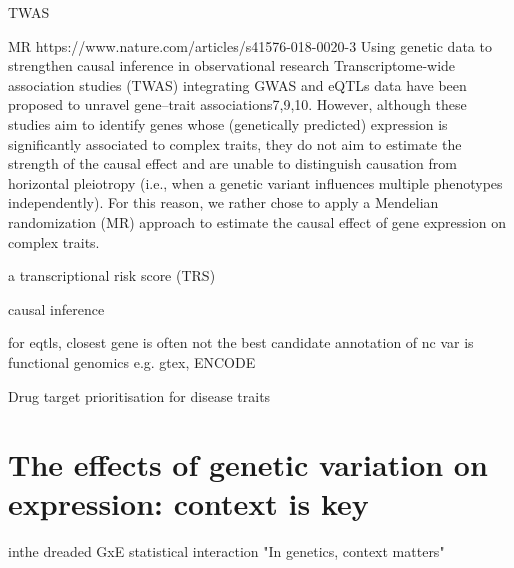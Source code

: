 \begin{outline}
    \2 TWAS

    \2 MR
    https://www.nature.com/articles/s41576-018-0020-3
    Using genetic data to strengthen causal inference in observational research
    Transcriptome-wide association studies (TWAS) integrating GWAS and eQTLs data have been proposed to unravel gene–trait associations7,9,10. However, although these studies aim to identify genes whose (genetically predicted) expression is significantly associated to complex traits, they do not aim to estimate the strength of the causal effect and are unable to distinguish causation from horizontal pleiotropy (i.e., when a genetic variant influences multiple phenotypes independently). For this reason, we rather chose to apply a Mendelian randomization (MR) approach to estimate the causal effect of gene expression on complex traits.

    \2 a transcriptional risk score (TRS)

    \2 causal inference

\1 for eqtls, closest gene is often not the best candidate
    \2 annotation of nc var is functional genomics
        \3 e.g. gtex, ENCODE

    \2 Drug target prioritisation for disease traits



\section{The effects of genetic variation on expression: context is key}


\1 inthe dreaded GxE statistical interaction
    \2 "In genetics, context matters"


\end{outline}
